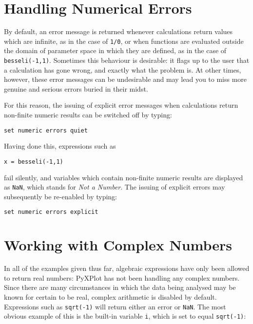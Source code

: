 \section{Handling Numerical Errors}
\label{sec:num_errs}

By default, an error message is returned whenever calculations return values
which are infinite, as in the case of {\tt 1/0}, or when functions are
evaluated outside the domain of parameter space in which they are defined, as
in the case of {\tt besseli(-1,1)}.  Sometimes this behaviour is desirable: it
flags up to the user that a calculation has gone wrong, and exactly what the
problem is.  At other times, however, these error messages can be undesirable
and may lead you to miss more genuine and serious errors buried in their midst.

For this reason, the issuing of explicit error messages when calculations
return non-finite numeric results can be switched off by typing:

\begin{verbatim}
set numeric errors quiet
\end{verbatim}

\noindent Having done this, expressions such as

\begin{verbatim}
x = besseli(-1,1)
\end{verbatim}

\noindent fail silently, and variables which contain non-finite numeric results
are displayed as {\tt NaN}, which stands for {\it Not a
Number}.  The issuing of explicit errors may subsequently
be re-enabled by typing: 

\begin{verbatim}
set numeric errors explicit
\end{verbatim}

\section{Working with Complex Numbers}
\label{sec:complex_numbers}

In all of the examples given thus far, algebraic expressions have only been
allowed to return real numbers: PyXPlot has not been handling any complex
numbers. Since there are many circumstances in which the data being analysed
may be known for certain to be real, complex arithmetic is disabled by default.
Expressions such as {\tt sqrt(-1)} will return either an error or {\tt NaN}.
The most obvious example of this is the built-in variable {\tt i}, which is set
to equal {\tt sqrt(-1)}:

